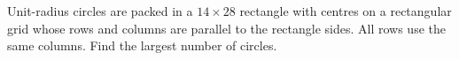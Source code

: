 Unit-radius circles are packed in a $14\times28$ rectangle with centres on a rectangular grid whose rows and columns are parallel to the rectangle sides. All rows use the same columns. Find the largest number of circles.
